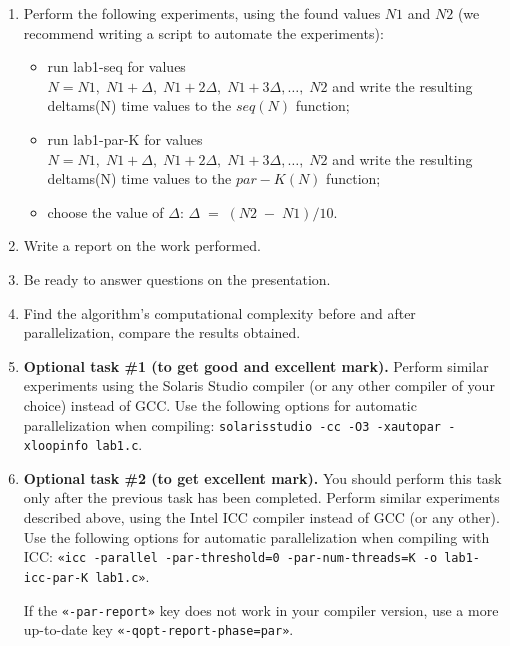 {\begin{enumerate}
		\item Perform the following experiments, using the found values $ N1 $ and $ N2 $ (we recommend writing a script to automate the experiments):
			\begin{itemize}
				\item run lab1-seq for values \\$N={N1,\;N1+\Delta,\;N1+2\Delta,\;N1+3\Delta,…,\;N2}$ and write the resulting  delta\textunderscore ms(N) time values to the $seq(N)$ function;
				\item run lab1-par-K for values \\$N={N1,\;N1+\Delta,\;N1+2\Delta,\;N1+3\Delta,…,\;N2}$ and write the resulting delta\textunderscore ms(N) time values to the $par-K(N)$ function;
				\item choose the value of $\Delta$: $\Delta\;=\;(N2\;-\;N1)/10$.
			\end{itemize}
		\item Write a report on the work performed.
		\item Be ready to answer questions on the presentation.
		\item Find the algorithm's computational complexity before and after parallelization, compare the results obtained.
		\sloppy
		\item\textbf{Optional task \#1 (to get good and excellent mark).} Perform similar experiments using the Solaris Studio compiler (or any other compiler of your choice) instead of GCC. Use the following options for automatic parallelization when compiling: {\small \texttt{solarisstudio -cc -O3 -xautopar -xloopinfo lab1.c}}.
 		\item\textbf{Optional task \#2 (to get excellent mark).} You should perform this task only after the previous task has been completed. Perform similar experiments described above, using the Intel ICC compiler instead of GCC (or any other). Use the following options for automatic parallelization when compiling with ICC: \verb+«icc -parallel -par-threshold=0 -par-num-threads=K -o lab1-icc-par-K lab1.c»+.
			\par If the \verb+«-par-report»+ key does not work in your compiler version, use a more up-to-date key \verb+«-qopt-report-phase=par»+.
	\end{enumerate}

}
